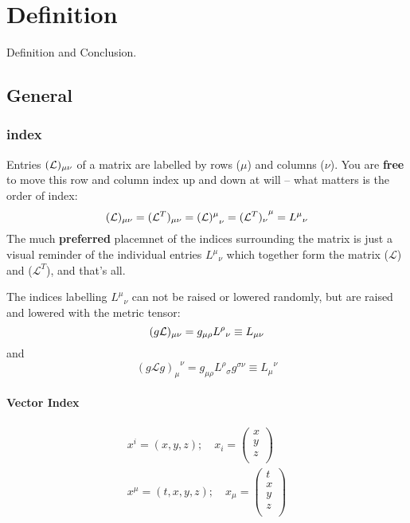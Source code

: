\chapter{Definition}
Definition and Conclusion.

\section{General}

\subsection{index}
Entries $(\mathcal{L})_{\mu\nu}$ of a matrix are labelled by rows ($\mu$) 
and columns ($\nu$).
You are \textbf{free} to move this row and column index up and down at 
will -- what matters is the order of index:
\[
    (\mathcal{L})_{\mu\nu} = (\mathcal{L}^T)_{\mu\nu} = {(\mathcal{L})^\mu}_\nu = {(\mathcal{L}^T)_\nu}^\mu = {L^\mu}_\nu
    \]
The much \textbf{preferred} placemnet of the indices surrounding the 
matrix is just a visual reminder of the individual entries ${L^\mu}_\nu$ 
which together form the matrix ($\mathcal{L}$) and ($\mathcal{L}^T$), 
and that's all.

The indices labelling ${L^\mu}_\nu$ can not be raised or lowered randomly,
but are raised and lowered with the metric tensor:
\[
    (g\mathcal{L})_{\mu\nu} = g_{\mu\rho}{L^\rho}_{\nu} \equiv L_{\mu\nu} 
    \]
and 
\[
    {(g\mathcal{L}g)_\mu}^\nu = g_{\mu\rho}{L^\rho}_\sigma g^{\sigma\nu} \equiv {L_\mu}^\nu
    \]

\subsubsection{Vector Index}
\begin{equation}
    \begin{gathered}
	x^i = (x, y, z); \quad 
	x_i = 
	\begin{pmatrix}
	    x   \\
	    y   \\
	    z   \\
	\end{pmatrix}   \\
	x^\mu = (t, x, y, z); \quad 
	x_\mu = 
	\begin{pmatrix}
	    t	\\
	    x   \\
	    y   \\
	    z   \\
	\end{pmatrix}   \\
    \end{gathered}
\end{equation}



